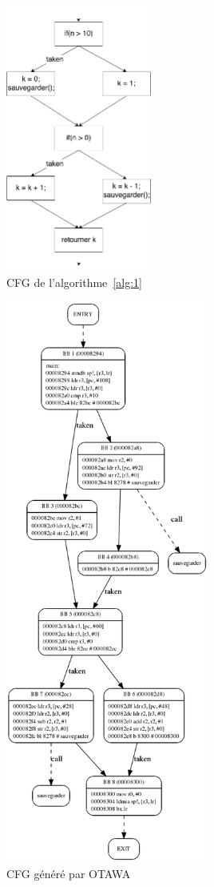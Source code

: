 \documentclass[french]{article}
\begin{document}
  \begin{figure}
    \centering
    \includegraphics[height=330px]{pictures/cfg.png}
    \caption{CFG de l'algorithme~\ref{alg:1}}
    \label{cfg}
  \end{figure}

  \begin{figure}
    \centering
    \includegraphics[height=525pt]{pictures/cfg_genere.png}
    \caption{CFG généré par OTAWA}
    \label{cfg_genere}
  \end{figure}
  
\end{document}

